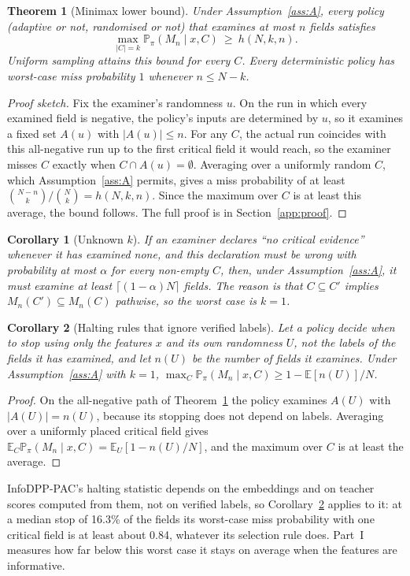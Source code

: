 \documentclass[11pt]{article}
\newtheorem{theorem}{Theorem}
\newtheorem{corollary}{Corollary}
\theoremstyle{remark}
\theoremstyle{definition}
\newcommand{\Prb}{\mathbb{P}}
\newcommand{\E}{\mathbb{E}}
\begin{document}
\begin{theorem}[Minimax lower bound]\label{thm:minimax}
Under Assumption~\ref{ass:A}, every policy (adaptive or not, randomised or not) that examines at most $n$ fields satisfies
\[
\max_{|C|=k}\Prb_\pi(M_n\mid x,C)\ \ge\ h(N,k,n).
\]
Uniform sampling attains this bound for every $C$. Every deterministic policy has worst-case miss probability $1$ whenever $n\le N-k$.
\end{theorem}
\begin{proof}[Proof sketch]
Fix the examiner's randomness $u$. On the run in which every examined field is negative, the policy's inputs are determined by $u$, so it examines a fixed set $A(u)$ with $|A(u)|\le n$. For any $C$, the actual run coincides with this all-negative run up to the first critical field it would reach, so the examiner misses $C$ exactly when $C\cap A(u)=\emptyset$. Averaging over a uniformly random $C$, which Assumption~\ref{ass:A} permits, gives a miss probability of at least $\binom{N-n}{k}/\binom{N}{k}=h(N,k,n)$. Since the maximum over $C$ is at least this average, the bound follows. The full proof is in Section~\ref{app:proof}.
\end{proof}

\begin{corollary}[Unknown $k$]\label{cor:unknown}
If an examiner declares ``no critical evidence'' whenever it has examined none, and this declaration must be wrong with probability at most $\alpha$ for every non-empty $C$, then, under Assumption~\ref{ass:A}, it must examine at least $\lceil(1-\alpha)N\rceil$ fields. The reason is that $C\subseteq C'$ implies $M_n(C')\subseteq M_n(C)$ pathwise, so the worst case is $k=1$.
\end{corollary}

\begin{corollary}[Halting rules that ignore verified labels]\label{cor:halting}
Let a policy decide when to stop using only the features $x$ and its own randomness $U$, not the labels of the fields it has examined, and let $n(U)$ be the number of fields it examines. Under Assumption~\ref{ass:A} with $k=1$, $\max_{C}\Prb_\pi(M_n\mid x,C)\ge 1-\E[n(U)]/N$.
\end{corollary}
\begin{proof}
On the all-negative path of Theorem~\ref{thm:minimax} the policy examines $A(U)$ with $|A(U)|=n(U)$, because its stopping does not depend on labels. Averaging over a uniformly placed critical field gives $\E_C\Prb_\pi(M_n\mid x,C)=\E_U[1-n(U)/N]$, and the maximum over $C$ is at least the average.
\end{proof}
InfoDPP-PAC's halting statistic depends on the embeddings and on teacher scores computed from them, not on verified labels, so Corollary~\ref{cor:halting} applies to it: at a median stop of 16.3\% of the fields its worst-case miss probability with one critical field is at least about 0.84, whatever its selection rule does. Part~I measures how far below this worst case it stays on average when the features are informative.
\end{document}
